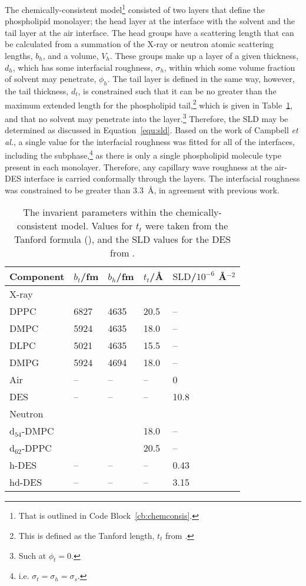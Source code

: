 The chemically-consistent model\footnote{That is outlined in Code Block~\ref{cb:chemconsis}.} consisted of two layers that define the phospholipid monolayer; the head layer at the interface with the solvent and the tail layer at the air interface.
The head groups have a scattering length that can be calculated from a summation of the X-ray or neutron atomic scattering lengths, $b_h$, and a volume, $V_h$.
These groups make up a layer of a given thickness, $d_h$, which has some interfacial roughness, $\sigma_h$, within which some volume fraction of solvent may penetrate, $\phi_h$.
The tail layer is defined in the same way, however, the tail thickness, $d_t$, is constrained such that it can be no greater than the maximum extended length for the phospholipid tail,\footnote{This is defined as the Tanford length, $t_t$ from \cite{tanford_hydrophobic_1980}.} which is given in Table~\ref{tab:invar}, and that no solvent may penetrate into the layer.\footnote{Such at $\phi_t=0$.}
Therefore, the $\text{SLD}$ may be determined as discussed in Equation~\ref{equ:sld}.
Based on the work of Campbell \emph{et al.},\autocite{campbell_structure_2018} a single value for the interfacial roughness was fitted for all of the interfaces, including the subphase,\footnote{i.e. $\sigma_t = \sigma_h = \sigma_s$.} as there is only a single phospholipid molecule type present in each monolayer.
Therefore, any capillary wave roughness at the air-DES interface is carried conformally through the layers.
The interfacial roughness was constrained to be greater than \SI{3.3}{\angstrom}, in agreement with previous work.\autocite{sanchez-fernandez_micellization_2016}
%
\begin{table}[b]
    \forceversofloat
    \centering
  \small
    \caption{The invarient parameters within the chemically-consistent model. Values for $t_t$ were taken from the Tanford formula (\cite{tanford_hydrophobic_1980}), and the SLD values for the DES from \cite{sanchez-fernandez_micellization_2016}.}
    \label{tab:invar}
    \begin{tabular}{l | l l l | l}
        \toprule
        Component & $b_t$/\si{\femto\meter} & $b_h$/\si{\femto\meter} & $t_t$/\AA & $\text{SLD}$/$10^{-6}$ \AA$^{-2}$ \\
        \midrule
    X-ray & & & & \\
        DPPC & 6827 & 4635 & 20.5 & -- \\
        DMPC & 5924 & 4635 & 18.0 & -- \\
        DLPC & 5021 & 4635 & 15.5 & -- \\
        DMPG & 5924 & 4694 & 18.0 & -- \\
        Air & -- & -- & -- & 0 \\
        DES & -- & -- & -- & 10.8 \\
        \midrule
        Neutron & & & & \\
        d$_{54}$-DMPC & & & 18.0 & -- \\
        d$_{62}$-DPPC & & & 20.5 & -- \\
        h-DES & -- & -- & -- & 0.43 \\
        hd-DES & -- & -- & -- & 3.15 \\
        \bottomrule
    \end{tabular}
\end{table}

